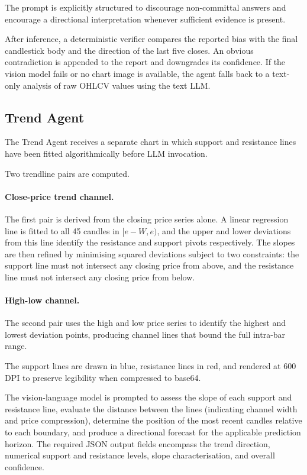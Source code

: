 The prompt is explicitly structured to discourage non-committal answers and encourage a directional interpretation whenever sufficient evidence is present.

After inference, a deterministic verifier compares the reported bias with the final candlestick body and the direction of the last five closes. An obvious contradiction is appended to the report and downgrades its confidence. If the vision model fails or no chart image is available, the agent falls back to a text-only analysis of raw OHLCV values using the text LLM.


\subsection{Trend Agent}

The Trend Agent receives a separate chart in which support and resistance lines have been fitted algorithmically before LLM invocation.

Two trendline pairs are computed.

\paragraph{Close-price trend channel.}
The first pair is derived from the closing price series alone. A linear regression line is fitted to all 45 candles in $[e-W,e)$, and the upper and lower deviations from this line identify the resistance and support pivots respectively. The slopes are then refined by minimising squared deviations subject to two constraints: the support line must not intersect any closing price from above, and the resistance line must not intersect any closing price from below.

\paragraph{High-low channel.}
The second pair uses the high and low price series to identify the highest and lowest deviation points, producing channel lines that bound the full intra-bar range.

The support lines are drawn in blue, resistance lines in red, and rendered at 600 DPI to preserve legibility when compressed to base64.

The vision-language model is prompted to assess the slope of each support and resistance line, evaluate the distance between the lines (indicating channel width and price compression), determine the position of the most recent candles relative to each boundary, and produce a directional forecast for the applicable prediction horizon. The required JSON output fields encompass the trend direction, numerical support and resistance levels, slope characterisation, and overall confidence.

